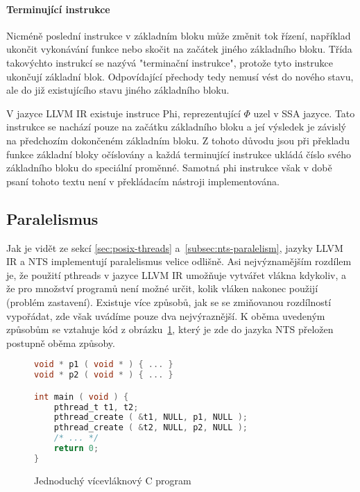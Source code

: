 \documentclass{fithesis2}
\begin{document}
\paragraph{Terminující instrukce}
Nicméně poslední instrukce v základním bloku může změnit tok řízení, například ukončit vykonávání funkce nebo skočit na začátek jiného základního bloku. Třída takovýchto instrukcí se nazývá "terminační instrukce", protože tyto instrukce ukončují základní blok. Odpovídající přechody tedy nemusí vést do nového stavu, ale do již existujícího stavu jiného základního bloku.

V jazyce LLVM IR existuje instruce Phi, reprezentující $\Phi$ uzel  v SSA jazyce. Tato instrukce se nachází pouze na začátku základního bloku a jeí výsledek je závislý na předchozím dokončeném základním bloku. Z tohoto důvodu jsou při překladu funkce základní bloky očíslovány a každá terminující instrukce ukládá číslo svého základního bloku do speciální proměnné. Samotná phi instrukce však v době psaní tohoto textu není v překládacím nástroji implementována.




\subsection{Paralelismus}
\label{subsec:paralelism}
Jak je vidět ze sekcí \ref{sec:posix-threads} a~\ref{subsec:nts-paralelism}, jazyky LLVM IR a NTS implementují paralelismus velice odlišně. Asi nejvýznamějším rozdílem je, že použití pthreads v jazyce LLVM IR umožňuje vytvářet vlákna kdykoliv, a že pro množství programů není možné určit, kolik vláken nakonec použijí (problém zastavení). Existuje více způsobů, jak se se zmiňovanou rozdílností vypořádat, zde však uvádíme pouze dva nejvýraznější. K oběma uvedeným způsobům se vztahuje kód z obrázku~\ref{fig:llvm2nts:simple-c:orig}, který je zde do jazyka NTS přeložen postupně oběma způsoby.

\begin{figure}[h]
\begin{lstlisting}[language=C]
void * p1 ( void * ) { ... }
void * p2 ( void * ) { ... }

int main ( void ) {
	pthread_t t1, t2;
	pthread_create ( &t1, NULL, p1, NULL );
	pthread_create ( &t2, NULL, p2, NULL );
	/* ... */
	return 0;
}
\end{lstlisting}
\caption{Jednoduchý vícevláknový C program}
\label{fig:llvm2nts:simple-c:orig}
\end{figure}
\end{document}
